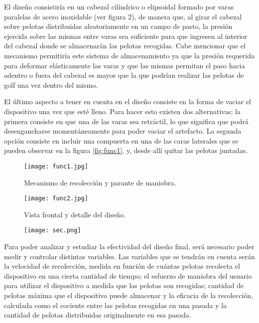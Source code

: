 El diseño consistiría en un cabezal cilíndrico o elipsoidal formado por varas paralelas de acero inoxidable (ver figura 2), de manera que, al girar el cabezal sobre pelotas distribuidas aleatoriamente en un campo de pasto, la presión ejercida sobre las mismas entre varas sea suficiente para que ingresen al interior del cabezal donde se almacenarán las pelotas recogidas. Cabe mencionar que el mecanismo permitiría este sistema de almacenamiento ya que la presión requerida para deformar elásticamente las varas y que las mismas permitan el paso hacia adentro o fuera del cabezal es mayor que la que podrían realizar las pelotas de golf una vez dentro del mismo.

El último aspecto a tener en cuenta en el diseño consiste en la forma de vaciar el dispositivo una vez que esté lleno. Para hacer esto existen dos alternativas; la primera consiste en que una de las varas sea retráctil, lo que significa que podrá desengancharse momentáneamente para poder vaciar el artefacto. La segunda opción consiste en incluir una compuerta en una de las caras laterales que se pueden observar en la figura \ref{fig:func1}, y, desde allí quitar las pelotas juntadas.

\begin{figure}[H]
\centering
\begin{minipage}{.5\textwidth}
  \centering
  \texttt{[image: func1.jpg]}
  \caption{Mecanismo de recolección y parante de maniobra.}
  \label{fig:func1}
\end{minipage}%
\hfill
\begin{minipage}{.5\textwidth}
  \centering
  \texttt{[image: func2.jpg]}
  \caption{Vista frontal y detalle del diseño.}
  \label{fig:func2}
\end{minipage}
\end{figure}

\begin{figure}[H]
\centering
\texttt{[image: sec.png]}
\label{fig:sec}
\end{figure}

Para poder analizar y estudiar la efectividad del diseño final, será necesario poder medir y controlar distintas variables. Las variables que se tendrán  en cuenta serán la velocidad de recolección, medida en función de cuántas pelotas recolecta el dispositivo en una cierta cantidad de tiempo; el esfuerzo de maniobra del usuario para utilizar el dispositivo a medida que las pelotas son recogidas; cantidad de pelotas máxima que el dispositivo puede almacenar y la eficacia de la recolección, calculada como el cociente entre las pelotas recogidas en una pasada y la cantidad de pelotas distribuidas originalmente en esa pasada.

